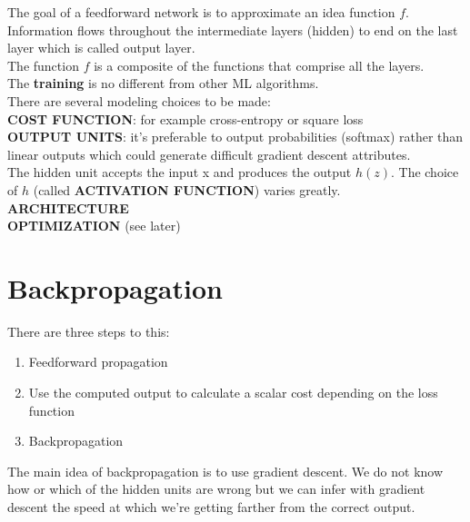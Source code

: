 The goal of a feedforward network is to approximate an idea function $f$. Information flows throughout the intermediate layers (hidden) to end on the last layer which is called output layer. \\
The function $f$ is a composite of the functions that comprise all the layers.\\
The {\bf training} is no different from other ML algorithms. \\
There are several modeling choices to be made:\\
{\bf COST FUNCTION}: for example cross-entropy or square loss\\
{\bf OUTPUT UNITS}: it's preferable to output probabilities (softmax) rather than linear outputs which could generate difficult gradient descent attributes. \\
The hidden unit accepts the input x and produces the output $h(z)$. The choice of $h$ (called {\bf ACTIVATION FUNCTION}) varies greatly. \\
{\bf ARCHITECTURE}\\
{\bf OPTIMIZATION }(see later)
\section{Backpropagation}
There are three steps to this:
\begin{enumerate}
	\item Feedforward propagation
	\item Use the computed output to calculate a scalar cost depending on the loss function
	\item Backpropagation
\end{enumerate}

The main idea of backpropagation is to use gradient descent. We do not know how or which of the hidden units are wrong but we can infer with gradient descent the speed at which we're getting farther from the correct output.

